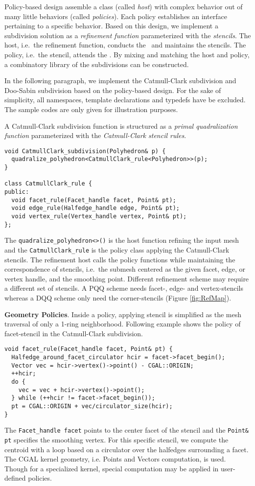 Policy-based design \cite{Alexandrescu:2001:MCD} assemble a 
class (called \emph{host}) with complex behavior out of many 
little behaviors (called \emph{policies}). Each policy establishes
an interface pertaining to a specific behavior.
Based on this design, we implement a subdivision solution as 
a \emph{refinement function} parameterized with the 
\emph{stencils}. The host, i.e.\ the refinement function,
conducts the \tr\ and maintains the stencils. The policy,
i.e.\ the stencil, attends the \gm . By mixing and matching
the host and policy, a combinatory library of the subdivisions
can be constructed. 

In the following paragraph, we implement the Catmull-Clark 
subdivision and Doo-Sabin subdivision based on the 
policy-based design. For the sake of simplicity, all 
namespaces, template declarations
and typedefs have be excluded. The sample codes are only
given for illustration purposes.

A Catmull-Clark subdivision function is structured 
as a \emph{primal quadralization function} parameterized 
with the \emph{Catmull-Clark stencil rules}.
\begin{lstlisting}
void CatmullClark_subdivision(Polyhedron& p) {
  quadralize_polyhedron<CatmullClark_rule<Polyhedron>>(p);
}

class CatmullClark_rule {
public:
  void facet_rule(Facet_handle facet, Point& pt);
  void edge_rule(Halfedge_handle edge, Point& pt);
  void vertex_rule(Vertex_handle vertex, Point& pt);
};
\end{lstlisting}
The \lstinline!quadralize_polyhedron<>()! is the host function
refining the input mesh
and the \lstinline!CatmullClark_rule!
is the policy class applying the Catmull-Clark stencils. 
The refinement host calls the policy
functions while maintaining the correspondence of stencils, 
i.e.\ the submesh centered as the given facet, edge, or
vertex handle, and the smoothing point.
Different refinement scheme may require a 
different set of stencils. A PQQ scheme needs
facet-, edge- and vertex-stencils whereas a DQQ scheme 
only need the corner-stencils (Figure \ref{fig:RefMap}).

\noindent\textbf{Geometry Policies}.
Inside a policy, applying stencil is simplified as 
the mesh traversal of only a 1-ring neighborhood. 
Following example shows the policy of facet-stencil 
in the Catmull-Clark subdivision.
\begin{lstlisting}
void facet_rule(Facet_handle facet, Point& pt) {
  Halfedge_around_facet_circulator hcir = facet->facet_begin();
  Vector vec = hcir->vertex()->point() - CGAL::ORIGIN;
  ++hcir;
  do {
    vec = vec + hcir->vertex()->point();
  } while (++hcir != facet->facet_begin());
  pt = CGAL::ORIGIN + vec/circulator_size(hcir);
}
\end{lstlisting}
The \lstinline!Facet_handle facet! points to the 
center facet of the stencil and the \lstinline!Point& pt! 
specifies the smoothing vertex. For this specific stencil, 
we compute the centroid with a loop based on a circulator 
over the halfedges surrounding a facet. The CGAL kernel 
geometry, i.e. Points and Vectors computation, is used. 
Though for a specialized kernel, special computation may be 
applied in user-defined policies.
 
